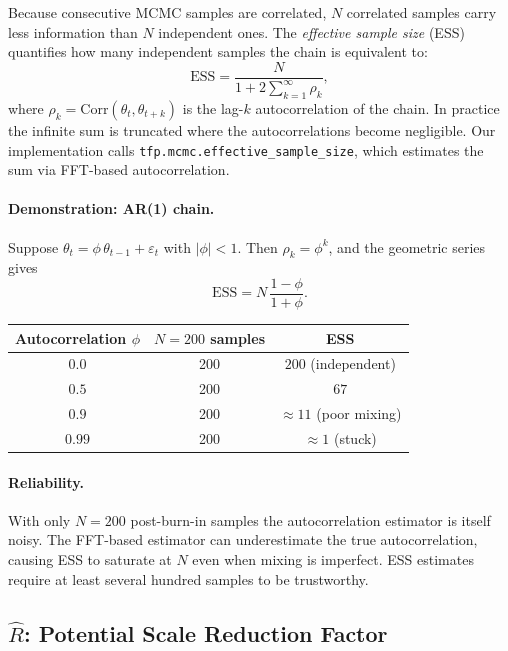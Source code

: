 \documentclass{article}
\begin{document}
Because consecutive MCMC samples are correlated, $N$ correlated samples carry less information
than $N$ independent ones.  The \emph{effective sample size} (ESS) quantifies how many
independent samples the chain is equivalent to:
\begin{equation}
  \mathrm{ESS} = \frac{N}{1 + 2\displaystyle\sum_{k=1}^{\infty} \rho_k},
\end{equation}
where $\rho_k = \mathrm{Corr}(\theta_t, \theta_{t+k})$ is the lag-$k$ autocorrelation of the
chain.  In practice the infinite sum is truncated where the autocorrelations become negligible.
Our implementation calls \texttt{tfp.mcmc.effective\_sample\_size}, which estimates the sum via
FFT-based autocorrelation.

\paragraph{Demonstration: AR(1) chain.}
Suppose $\theta_t = \phi\,\theta_{t-1} + \varepsilon_t$ with $|\phi| < 1$.  Then
$\rho_k = \phi^k$, and the geometric series gives
\begin{equation}
  \mathrm{ESS} = N\,\frac{1 - \phi}{1 + \phi}.
\end{equation}
\begin{center}
\begin{tabular}{ccc}
\toprule
Autocorrelation $\phi$ & $N = 200$ samples & ESS \\
\midrule
$0.0$ & 200 & $200$ \quad (independent) \\
$0.5$ & 200 & $67$ \\
$0.9$ & 200 & $\approx 11$ \quad (poor mixing) \\
$0.99$ & 200 & $\approx 1$ \quad (stuck) \\
\bottomrule
\end{tabular}
\end{center}

\paragraph{Reliability.}
With only $N = 200$ post-burn-in samples the autocorrelation estimator is itself noisy.  The
FFT-based estimator can underestimate the true autocorrelation, causing ESS to saturate at $N$
even when mixing is imperfect.  ESS estimates require at least several hundred samples to be
trustworthy.

\subsection{$\hat{R}$: Potential Scale Reduction Factor}
\end{document}
